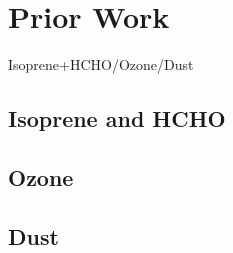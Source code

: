 \section{Prior Work}
Isoprene+HCHO/Ozone/Dust
  
\subsection{Isoprene and HCHO}

\subsection{Ozone}

\subsection{Dust}

